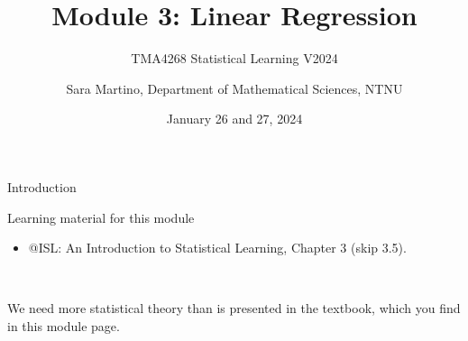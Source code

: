 \documentclass[
  10pt,
  ignorenonframetext,
]{beamer}
\title{Module 3: Linear Regression}
\subtitle{TMA4268 Statistical Learning V2024}
\author{Sara Martino, Department of Mathematical Sciences, NTNU}
\date{January 26 and 27, 2024}
\providecommand{\tightlist}{%
  \setlength{\itemsep}{0pt}\setlength{\parskip}{0pt}}
\begin{document}
\frame{\titlepage}

\begin{frame}
\end{frame}

\begin{frame}{Introduction}
\protect\hypertarget{introduction}{}
\begin{block}{Learning material for this module}
\protect\hypertarget{learning-material-for-this-module}{}
\(~\)

\begin{itemize}
\tightlist
\item
  @ISL: An Introduction to Statistical Learning, Chapter 3 (skip 3.5).
\end{itemize}

\(~\)

We need more statistical theory than is presented in the textbook, which
you find in this module page.
\end{block}
\end{frame}
\end{document}
